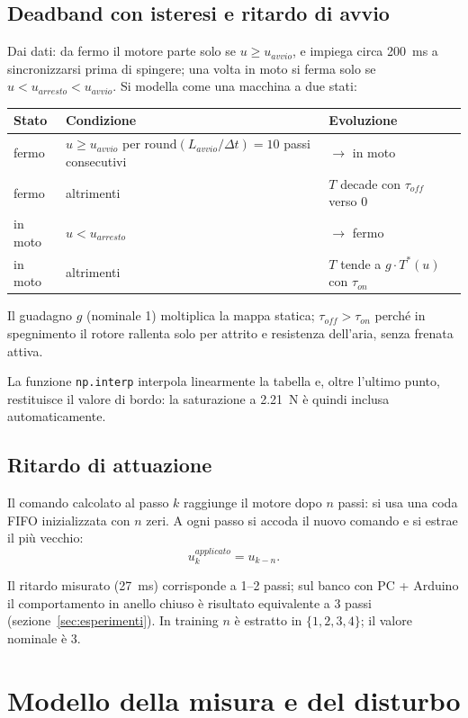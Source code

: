 \documentclass[11pt,a4paper]{article}
\newcommand{\code}[1]{\texttt{\small #1}}
\newcommand{\envfile}{../../controller/env_fan.py}
\newcommand{\envlines}[2]{}
\begin{document}
\subsection{Deadband con isteresi e ritardo di avvio}
Dai dati: da fermo il motore parte solo se $u \ge u_{avvio}$, e impiega circa 200~ms a sincronizzarsi
prima di spingere; una volta in moto si ferma solo se $u < u_{arresto} < u_{avvio}$. Si modella come
una macchina a due stati:
\begin{center}
\begin{tabular}{@{}lll@{}}
\toprule
Stato & Condizione & Evoluzione\\
\midrule
fermo & $u \ge u_{avvio}$ per $\mathrm{round}(L_{avvio}/\Delta t) = 10$ passi consecutivi & $\to$ in moto\\
fermo & altrimenti & $T$ decade con $\tau_{off}$ verso 0\\
in moto & $u < u_{arresto}$ & $\to$ fermo\\
in moto & altrimenti & $T$ tende a $g\cdot T^*(u)$ con $\tau_{on}$\\
\bottomrule
\end{tabular}
\end{center}
Il guadagno $g$ (nominale 1) moltiplica la mappa statica; $\tau_{off} > \tau_{on}$ perché in
spegnimento il rotore rallenta solo per attrito e resistenza dell'aria, senza frenata attiva.
\envlines{186}{205}
La funzione \code{np.interp} interpola linearmente la tabella e, oltre l'ultimo punto, restituisce
il valore di bordo: la saturazione a 2.21~N è quindi inclusa automaticamente.

\subsection{Ritardo di attuazione}
Il comando calcolato al passo $k$ raggiunge il motore dopo $n$ passi: si usa una coda FIFO
inizializzata con $n$ zeri. A ogni passo si accoda il nuovo comando e si estrae il più vecchio:
\begin{equation}
u^{applicato}_k = u_{k-n}.
\end{equation}
\envlines{276}{278}
Il ritardo misurato (27~ms) corrisponde a 1--2 passi; sul banco con PC + Arduino il comportamento
in anello chiuso è risultato equivalente a 3 passi (sezione~\ref{sec:esperimenti}). In training $n$
è estratto in $\{1,2,3,4\}$; il valore nominale è 3.

\section{Modello della misura e del disturbo}
\end{document}
